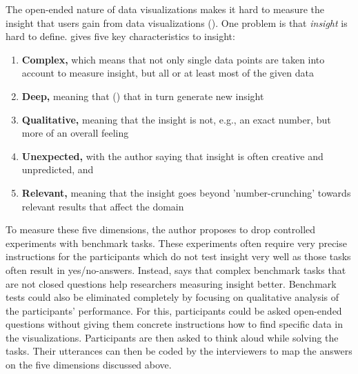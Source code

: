 The open-ended nature of data visualizations makes it hard to measure the insight that users gain from data visualizations (\cite{northMeasuringVisualizationInsight2006}). One problem is that \emph{insight} is hard to define. \citeauthor{northMeasuringVisualizationInsight2006} gives five key characteristics to insight:
\begin{enumerate}
    \item \textbf{Complex,} which means that not only single data points are taken into account to measure insight, but all or at least most of the given data
    \item \textbf{Deep,} meaning that  (\cite[6]{northMeasuringVisualizationInsight2006}) that in turn generate new insight
    \item \textbf{Qualitative,} meaning that the insight is not, e.g., an exact number, but more of an overall feeling
    \item \textbf{Unexpected,} with the author saying that insight is often creative and unpredicted, and
    \item \textbf{Relevant,} meaning that the insight goes beyond 'number-crunching' towards relevant results that affect the domain
\end{enumerate}
To measure these five dimensions, the author proposes to drop controlled experiments with benchmark tasks. These experiments often require very precise instructions for the participants which do not test insight very well as those tasks often result in yes/no-answers. Instead, \citeauthor{northMeasuringVisualizationInsight2006} says that complex benchmark tasks that are not closed questions help researchers measuring insight better. Benchmark tests could also be eliminated completely by focusing on qualitative analysis of the participants' performance. For this, participants could be asked open-ended questions without giving them concrete instructions how to find specific data in the visualizations. Participants are then asked to think aloud while solving the tasks. Their utterances can then be coded by the interviewers to map the answers on the five dimensions discussed above.
